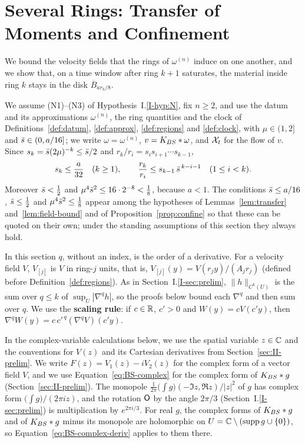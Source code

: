 \section{Several Rings: Transfer of Moments and Confinement}
\label{sec:several}

We bound the velocity fields that the rings of $\omega^{(n)}$ induce on one
another, and we show that, on a time window after ring $k+1$ saturates, the
material inside ring $k$ stays in the disk $\overline B_{ar_k/8}$.

We assume \textup{(N1)}--\textup{(N3)} of Hypothesis~I.\ref{I-hyp:N}, fix
$n\ge2$, and use the datum and its approximations $\omega^{(n)}$, the ring
quantities and the clock of Definitions~\ref{def:datum}, \ref{def:approx},
\ref{def:regions} and \ref{def:clock}, with $\mu\in(1,2]$ and $\bar s\in(0,a/16]$; we write
$\omega=\omega^{(n)}$, $v=K_{BS}\ast\omega$, and $\mathcal{X}_t$ for the flow of $v$.
Since $s_k=\bar s(2\mu)^{-k}\le\bar s/2$ and $r_k/r_i=s_is_{i+1}\cdots s_{k-1}$,
\begin{equation}
\label{eq:sk-small}
s_k\le\frac a{32}\quad(k\ge1),\qquad
\frac{r_k}{r_i}\le s_{k-1}\,\bar s^{\,k-i-1}\quad(1\le i<k).
\end{equation}
Moreover $\bar s<\frac12$ and
$\mu^4\bar s^2\le16\cdot2^{-8}<\frac18$, because $a<1$. The conditions
$\bar s\le a/16$, $\bar s\le\frac12$ and $\mu^4\bar s^2\le\frac18$ appear
among the hypotheses of Lemmas~\ref{lem:transfer} and~\ref{lem:field-bound} and of
Proposition~\ref{prop:confine} so that these can be quoted on
their own; under the standing assumptions of this section they always hold.

In this section $q$, without an index, is the order of a derivative.
For a velocity field $V$, $V_{[j]}$ is $V$ in ring-$j$ units,
that is, $V_{[j]}(y)=V(r_jy)/(A_jr_j)$ (defined before
Definition~\ref{def:regions}). As in
Section~I.\ref{I-sec:prelim}, $\|h\|_{C^k(U)}$ is the sum over $q\le k$ of
$\sup_U|\nabla^qh|$, so the proofs below bound each $\nabla^q$ and then sum over
$q$. We use the \textbf{scaling
rule}: if $c\in\mathbb{R}$, $c'>0$ and $W(y)=cV(c'y)$, then
$\nabla^qW(y)=c\,c'^{\,q}(\nabla^qV)(c'y)$.

In the complex-variable calculations below, we use the spatial variable
$z\in\mathbb{C}$ and the conventions for $V(z)$ and its Cartesian derivatives
from Section~\ref{sec:II-prelim}.
We write $F(z)=V_1(z)-iV_2(z)$ for the complex form of a vector field $V$, and we use
Equation~\eqref{eq:BS-complex} for the complex form of $K_{BS}\ast g$
(Section~\ref{sec:II-prelim}). The monopole
$\frac1{2\pi}\big(\int g\big)(-\Im z,\Re z)/|z|^2$ of $g$ has complex form $\big(\int g\big)/(2\pi iz)$,
and the rotation $\mathsf{O}$ by the angle $2\pi/3$ (Section~I.\ref{I-sec:prelim}) is
multiplication by $e^{2\pi i/3}$. For real $g$, the complex forms
of $K_{BS}\ast g$ and of $K_{BS}\ast g$ minus its monopole are holomorphic on
$U=\mathbb{C}\setminus(\operatorname{supp} g\cup\{0\})$, so Equation~\eqref{eq:BS-complex-deriv}
applies to them there.

